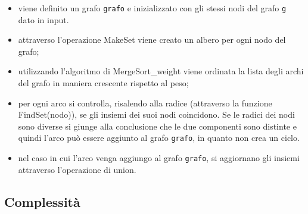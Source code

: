 \begin{itemize}
    \item viene definito un grafo \texttt{grafo} e inizializzato con gli stessi nodi del grafo \texttt{g} dato in input.
    \item attraverso l'operazione MakeSet viene creato un albero per ogni nodo del grafo;
    \item utilizzando l'algoritmo di MergeSort\_weight viene ordinata la lista degli archi del grafo in maniera crescente rispetto al peso;
    \item per ogni arco si controlla, risalendo alla radice (attraverso la funzione FindSet(nodo)), se gli insiemi dei suoi nodi coincidono. Se le radici dei nodi sono diverse si giunge alla conclusione che le due componenti sono distinte e quindi l'arco può essere aggiunto al grafo \texttt{grafo}, in quanto non crea un ciclo. 
    \item nel caso in cui l'arco venga aggiungo al grafo \texttt{grafo}, si aggiornano gli insiemi attraverso l'operazione di union.
\end{itemize}


\subsection{Complessità}
\label{complessità}